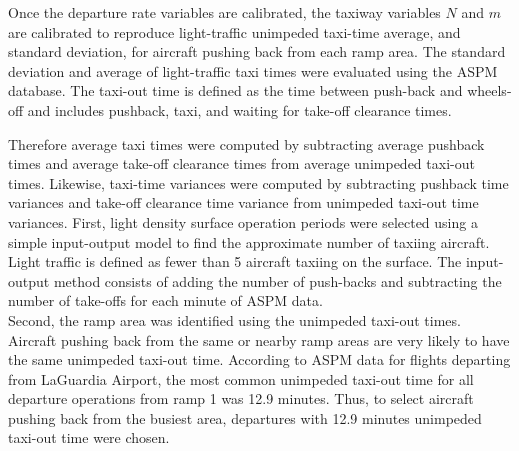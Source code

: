 \documentclass[letterpaper]{article}
\begin{document}
Once the departure rate variables are calibrated, the taxiway variables $N$ and $m$ are calibrated to reproduce light-traffic unimpeded taxi-time average, and standard deviation, for aircraft pushing back from each ramp area. The standard deviation and average of light-traffic taxi times were evaluated using the ASPM database. The taxi-out time is defined as the time between push-back and wheels-off and includes pushback, taxi, and waiting for take-off clearance times. 
\iffalse
In addition, ASPM data provide unimpeded taxi out times, i.e. times it takes for aircraft to transit from pushback to take-off when the taxiway system is empty and aircraft can travel directly to the runway threshold. The unimpeded taxi-out times are defined by the FAA as ``the estimated Taxi Out Time for an aircraft by carrier under optimal operating conditions (when congestion, weather, or other delay factors are not significant). This number is estimated by calendar year and season for each carrier and airport reporting ASQP and ARINC data'' \cite{faa2010}. These times depend on the ramp area from which aircraft have pushed back. 
They are computed by the FAA as follow: ``first, the unimpeded taxi-out time is redefined in terms of available data as the taxi-out time when the departure queue is equal to one and the arrival queue is equal to zero. Then, a linear regression of the
observed taxi-out times with the observed departure and arrival queues is conducted, and the unimpeded
taxi-out time is estimated from this equation by setting the departure queue equal to 1 and arrival queue
equal to 0'' \cite{Simaiakis2009}. 
\fi
Therefore average taxi times were computed by subtracting average pushback times and average take-off clearance times from average unimpeded taxi-out times. Likewise, taxi-time variances were computed by subtracting pushback time variances and take-off clearance time variance from unimpeded taxi-out time variances.
\iffalse
\indent First, light density surface operation periods were selected using a simple input-output model to find the approximate number of 
taxiing aircraft. Light traffic is defined as fewer than 5 aircraft taxiing on the surface. The input-output method consists of adding the 
number of push-backs and subtracting the number of take-offs for each minute of ASPM data.\\
\indent Second, the ramp area was identified using the unimpeded taxi-out times. Aircraft pushing back from the same or nearby ramp areas are very likely to have the same unimpeded taxi-out time. According to ASPM data for flights departing from LaGuardia Airport, the most common unimpeded taxi-out time for all departure operations from ramp 1 was 12.9 minutes. Thus, to select aircraft pushing back from the busiest area, departures with 12.9 minutes unimpeded taxi-out time were chosen.\\
\end{document}
